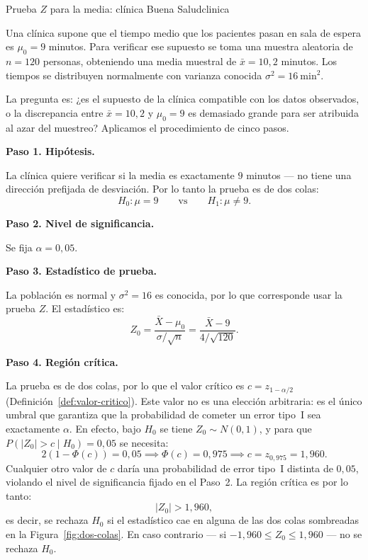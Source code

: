 \documentclass[12pt, a4paper]{book}
\numberwithin{equation}{chapter}
\begin{document}
\begin{ejemplo}{Prueba $Z$ para la media: cl\'{i}nica
		Buena Salud}{clinica}
	
	Una cl\'{i}nica supone que el tiempo medio que los
	pacientes pasan en sala de espera es $\mu_0 = 9$
	minutos. Para verificar ese supuesto se toma una
	muestra aleatoria de $n = 120$ personas, obteniendo
	una media muestral de $\bar{x} = 10{,}2$ minutos.
	Los tiempos se distribuyen normalmente con varianza
	conocida $\sigma^2 = 16\ \text{min}^2$.
	
	La pregunta es: ¿es el supuesto de la cl\'{i}nica
	compatible con los datos observados, o la
	discrepancia entre $\bar{x} = 10{,}2$ y
	$\mu_0 = 9$ es demasiado grande para ser atribuida
	al azar del muestreo? Aplicamos el procedimiento
	de cinco pasos.
	
	\medskip
	\textbf{Paso 1. Hip\'{o}tesis.}
	
	La cl\'{i}nica quiere verificar si la media es
	exactamente $9$ minutos --- no tiene una direcci\'{o}n
	prefijada de desviaci\'{o}n. Por lo tanto la prueba
	es de dos colas:
	\[
	H_0: \mu = 9 \qquad \text{vs} \qquad
	H_1: \mu \neq 9.
	\]
	
	\medskip
	\textbf{Paso 2. Nivel de significancia.}
	
	Se fija $\alpha = 0{,}05$.
	
	\medskip
	\textbf{Paso 3. Estad\'{i}stico de prueba.}
	
	La poblaci\'{o}n es normal y $\sigma^2 = 16$ es
	conocida, por lo que corresponde usar la prueba
	$Z$. El estad\'{i}stico es:
	\[
	Z_0 = \frac{\bar{X} - \mu_0}{\sigma/\sqrt{n}}
	= \frac{\bar{X} - 9}{4/\sqrt{120}}.
	\]
	
	\medskip
	\textbf{Paso 4. Regi\'{o}n cr\'{i}tica.}
	
	La prueba es de dos colas, por lo que el valor
	cr\'{i}tico es $c = z_{1-\alpha/2}$
	(Definici\'{o}n~\ref{def:valor-critico}). Este
	valor no es una elecci\'{o}n arbitraria: es el
	\'{u}nico umbral que garantiza que la probabilidad
	de cometer un error tipo~I sea exactamente
	$\alpha$. En efecto, bajo $H_0$ se tiene
	$Z_0 \sim N(0,1)$, y para que
	$P(|Z_0| > c \mid H_0) = 0{,}05$ se necesita:
	\[
	2(1 - \Phi(c)) = 0{,}05
	\implies \Phi(c) = 0{,}975
	\implies c = z_{0{,}975} = 1{,}960.
	\]
	Cualquier otro valor de $c$ dar\'{i}a una
	probabilidad de error tipo~I distinta de $0{,}05$,
	violando el nivel de significancia fijado en el
	Paso~2. La regi\'{o}n cr\'{i}tica es por lo tanto:
	\[
	|Z_0| > 1{,}960,
	\]
	es decir, se rechaza $H_0$ si el estad\'{i}stico
	cae en alguna de las dos colas sombreadas en la
	Figura~\ref{fig:dos-colas}. En caso contrario
	--- si $-1{,}960 \leq Z_0 \leq 1{,}960$ --- no
	se rechaza $H_0$.
	

\end{ejemplo}
\end{document}
